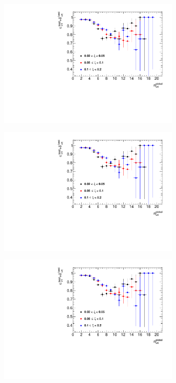 \begin{figure}[h!]
\begin{subfigure}{.47\textwidth}
		\includegraphics[width=\textwidth,page=5]{chapters/chrgSTAR/img/vertex/vertexEffi_ksi.pdf}
	\end{subfigure}
	\begin{subfigure}{.47\textwidth}
		\includegraphics[width=\textwidth,page=6]{chapters/chrgSTAR/img/vertex/vertexEffi_ksi.pdf}
	\end{subfigure}
	\begin{subfigure}{.47\textwidth}
		\includegraphics[width=\textwidth,page=7]{chapters/chrgSTAR/img/vertex/vertexEffi_ksi.pdf}

\end{subfigure}
\end{figure}
